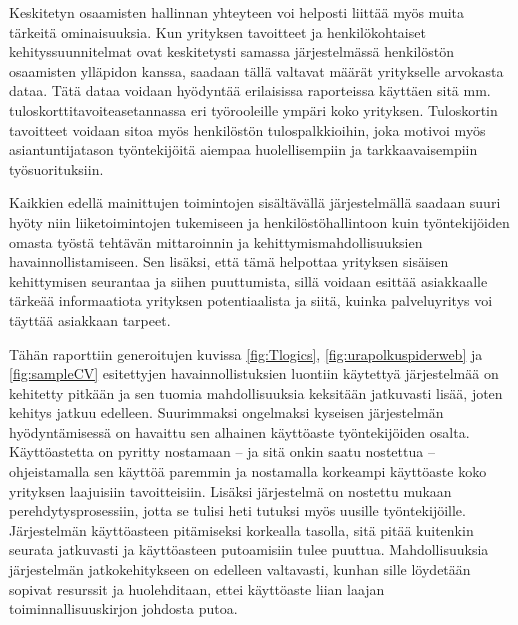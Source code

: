 \documentclass[a4paper,finnish,12pt]{article}
\begin{document}
Keskitetyn osaamisten hallinnan yhteyteen voi helposti liittää myös muita tärkeitä ominaisuuksia. Kun yrityksen tavoitteet ja henkilökohtaiset kehityssuunnitelmat ovat keskitetysti samassa järjestelmässä henkilöstön osaamisten ylläpidon kanssa, saadaan tällä valtavat määrät yritykselle arvokasta dataa. Tätä dataa voidaan hyödyntää erilaisissa raporteissa käyttäen sitä mm. tuloskorttitavoiteasetannassa eri työrooleille ympäri koko yrityksen. Tuloskortin tavoitteet voidaan sitoa myös henkilöstön tulospalkkioihin, joka motivoi myös asiantuntijatason työntekijöitä aiempaa huolellisempiin ja tarkkaavaisempiin työsuorituksiin.

Kaikkien edellä mainittujen toimintojen sisältävällä järjestelmällä saadaan suuri hyöty niin liiketoimintojen tukemiseen ja henkilöstöhallintoon kuin työntekijöiden omasta työstä tehtävän mittaroinnin ja kehittymismahdollisuuksien havainnollistamiseen. Sen lisäksi, että tämä helpottaa yrityksen sisäisen kehittymisen seurantaa ja siihen puuttumista, sillä voidaan esittää asiakkaalle tärkeää informaatiota yrityksen potentiaalista ja siitä, kuinka palveluyritys voi täyttää asiakkaan tarpeet.

Tähän raporttiin generoitujen kuvissa \ref{fig:Tlogics}, \ref{fig:urapolkuspiderweb} ja \ref{fig:sampleCV} esitettyjen havainnollistuksien luontiin käytettyä järjestelmää on kehitetty pitkään ja sen tuomia mahdollisuuksia keksitään jatkuvasti lisää, joten kehitys jatkuu edelleen. Suurimmaksi ongelmaksi kyseisen järjestelmän hyödyntämisessä on havaittu sen alhainen käyttöaste työntekijöiden osalta. Käyttöastetta on pyritty nostamaan -- ja sitä onkin saatu nostettua -- ohjeistamalla sen käyttöä paremmin ja nostamalla korkeampi käyttöaste koko yrityksen laajuisiin tavoitteisiin. Lisäksi järjestelmä on nostettu mukaan perehdytysprosessiin, jotta se tulisi heti tutuksi myös uusille työntekijöille. Järjestelmän käyttöasteen pitämiseksi korkealla tasolla, sitä pitää kuitenkin seurata jatkuvasti ja käyttöasteen putoamisiin tulee puuttua. Mahdollisuuksia järjestelmän jatkokehitykseen on edelleen valtavasti, kunhan sille löydetään sopivat resurssit ja huolehditaan, ettei käyttöaste liian laajan toiminnallisuuskirjon johdosta putoa.

\clearpage



\appendix
\end{document}

